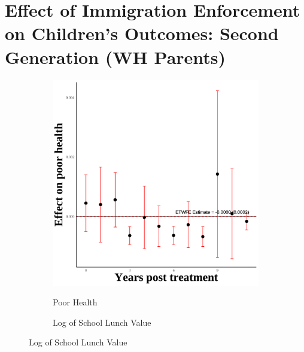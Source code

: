 \documentclass[12pt,english]{article}
\begin{document}
\pagebreak

\section{Effect of Immigration Enforcement on Children's Outcomes: Second Generation (WH Parents)}
\begin{figure}[H]
  \caption{Effect of Immigration Enforcement on Second Generation Outcomes: WH Parents}
  \centering

  \begin{subfigure}[b]{0.3\textwidth}
    \centering
    \caption{Poor Health}
    \includegraphics[width=\linewidth]{figures/plot34-poor_health_event_study-secgen-wh.png}
    \label{fig:poor-health-secgen-wh}
  \end{subfigure}
  \hfill
  \begin{subfigure}[b]{0.3\textwidth}
    \centering
    \caption{Log of School Lunch Value}

\end{subfigure}
\end{figure}
\end{document}

